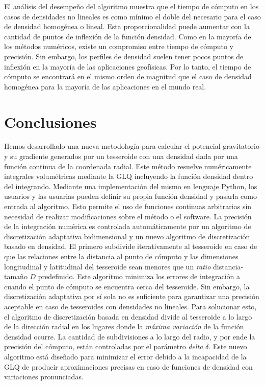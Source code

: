 El análisis del desempeño del algoritmo muestra que el tiempo de cómputo
en los casos de densidades no lineales es como mínimo el doble del
necesario para el caso de densidad homogénea o lineal.
Esta proporcionalidad puede aumentar con la cantidad de puntos de inflexión de
la función densidad.
Como en la mayoría de los métodos numéricos, existe un compromiso entre tiempo
de cómputo y precisión.
Sin embargo, los perfiles de densidad suelen tener pocos puntos de inflexión en
la mayoría de las aplicaciones geofísicas.
Por lo tanto, el tiempo de cómputo se encontrará en el mismo orden de magnitud
que el caso de densidad homogénea para la mayoría de las aplicaciones en el
mundo real.


\section{Conclusiones}

Hemos desarrollado una nueva metodología para calcular el potencial
gravitatorio y su gradiente generados por un tesseroide con una densidad dada
por una función continua de la coordenada radial.
Este método resuelve numéricamente integrales volumétricas mediante la
\ac{GLQ} incluyendo la función densidad dentro del integrando.
Mediante una implementación del mismo en lenguaje Python, los usuarios
y las usuarias pueden definir su propia función densidad y pasarla como
entrada al algoritmo.
Esto permite el uso de funciones continuas arbitrarias sin necesidad de
realizar modificaciones sobre el método o el software.
La precisión de la integración numérica es controlada automáticamente por un
algoritmo de discretización adaptativa bidimensional y un nuevo algoritmo de
discretización basado en densidad.
El primero subdivide iterativamente al tesseroide en caso de que las relaciones
entre la distancia al punto de cómputo y las dimensiones longitudinal
y latitudinal del tesseroide sean menores que un \emph{ratio} distancia-tamaño
$D$ predefinido.
Este algoritmo minimiza los errores de integración a cuando el punto de
cómputo se encuentra cerca del tesseroide.
Sin embargo, la discretización adaptativa por sí sola no es suficiente para
garantizar una precisión aceptable en caso de tesseroides con densidades no
lineales.
Para solucionar esto, el algoritmo de discretización basada en densidad divide
al tesseroide a lo largo de la dirección radial en los lugares donde la
\emph{máxima variación} de la función densidad ocurre.
La cantidad de subdivisiones a lo largo del radio, y por ende la precisión del
cómputo, están controladas por el parámetro \emph{delta} $\delta$.
Este nuevo algoritmo está diseñado para minimizar el error debido a la
incapacidad de la \ac{GLQ} de producir aproximaciones precisas en caso de
funciones de densidad con variaciones pronunciadas.


